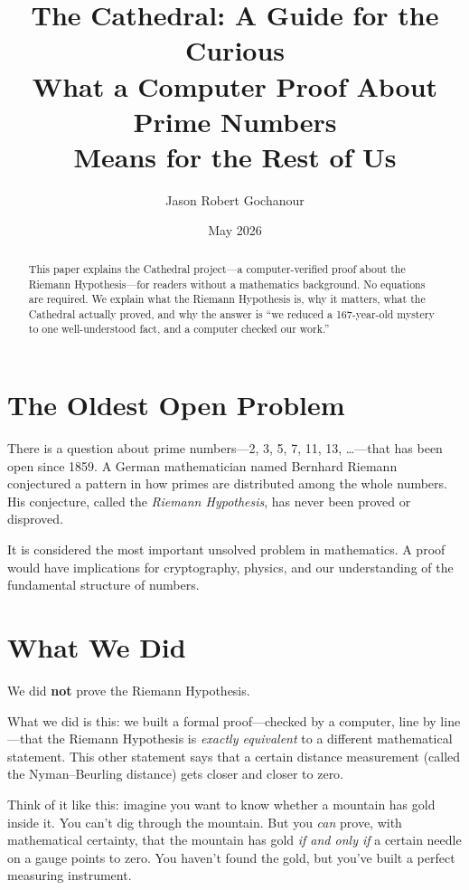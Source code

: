 \documentclass[11pt,a4paper]{article}
\title{%
  The Cathedral: A Guide for the Curious\\[4pt]
  \large What a Computer Proof About Prime Numbers\\
  \large Means for the Rest of Us%
}
\author{Jason Robert Gochanour}
\date{May 2026}
\begin{document}
\maketitle

\begin{abstract}
This paper explains the Cathedral project---a computer-verified
proof about the Riemann Hypothesis---for readers without a
mathematics background. No equations are required. We explain what
the Riemann Hypothesis is, why it matters, what the Cathedral
actually proved, and why the answer is ``we reduced a 167-year-old
mystery to one well-understood fact, and a computer checked
our work.''
\end{abstract}

\section{The Oldest Open Problem}

There is a question about prime numbers---2, 3, 5, 7, 11, 13,
\ldots---that has been open since 1859. A German mathematician
named Bernhard Riemann conjectured a pattern in how primes are
distributed among the whole numbers. His conjecture, called the
\emph{Riemann Hypothesis}, has never been proved or disproved.

It is considered the most important unsolved problem in mathematics.
A proof would have implications for cryptography, physics, and our
understanding of the fundamental structure of numbers.

\section{What We Did}

We did \textbf{not} prove the Riemann Hypothesis.

What we did is this: we built a formal proof---checked by a
computer, line by line---that the Riemann Hypothesis is
\emph{exactly equivalent} to a different mathematical statement.
This other statement says that a certain distance measurement
(called the Nyman--Beurling distance) gets closer and closer to
zero.

Think of it like this: imagine you want to know whether a mountain
has gold inside it. You can't dig through the mountain. But you
\emph{can} prove, with mathematical certainty, that the mountain
has gold \emph{if and only if} a certain needle on a gauge points
to zero. You haven't found the gold, but you've built a perfect
measuring instrument.
\end{document}
